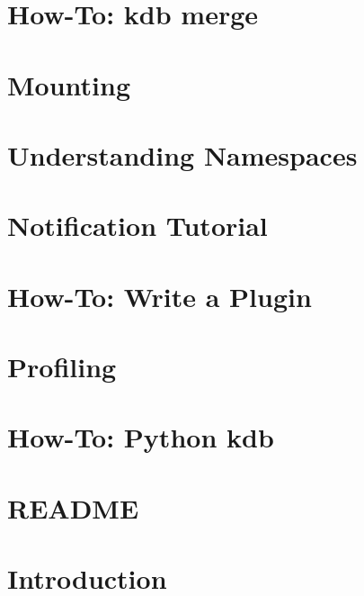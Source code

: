 \let\mypdfximage\pdfximage\def\pdfximage{\immediate\mypdfximage}\documentclass[twoside]{book}
\newcommand{\+}{\discretionary{\mbox{\scriptsize$\hookleftarrow$}}{}{}}
\begin{document}
\chapter{How-\/\+To\+: kdb merge}
\label{doc_tutorials_merge_md}

\chapter{Mounting}
\label{doc_tutorials_mount_md}

\chapter{Understanding Namespaces}
\label{doc_tutorials_namespaces_md}

\chapter{Notification Tutorial}
\label{doc_tutorials_notifications_md}

\chapter{How-\/\+To\+: Write a Plugin}
\label{doc_tutorials_plugins_md}

\chapter{Profiling}
\label{doc_tutorials_profiling_md}

\chapter{How-\/\+To\+: Python kdb}
\label{doc_tutorials_python-kdb_md}

\chapter{README}
\label{md_doc_tutorials_README}

\chapter{Introduction}
\label{doc_tutorials_run_all_tests_with_docker_md}

\end{document}
